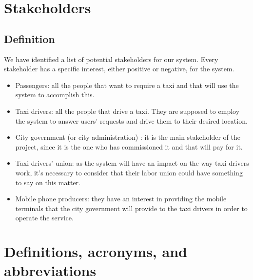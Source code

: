 \section{Stakeholders}
\subsection{Definition}
We have identified a list of potential stakeholders for our system. Every stakeholder has a specific interest, either positive or negative, for the system.
\begin{itemize}
\item Passengers: all the people that want to require a taxi and that will use the system to accomplish this.

\item Taxi drivers: all the people that drive a taxi. They are supposed to employ the system to answer users' requests and drive them to their desired location.

\item City government (or city administration) : it is the main stakeholder of the project, since it is the one who has commissioned it and that will pay for it.

\item Taxi drivers’ union: as the system will have an impact on the way taxi drivers work, it's necessary to consider that their labor union could have something to say on this matter. 

\item Mobile phone producers: they have an interest in providing the mobile terminals that the city government will provide to the taxi drivers in order to operate the service. 
\end{itemize}


\section{Definitions, acronyms, and abbreviations}
